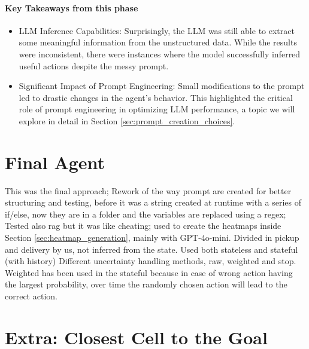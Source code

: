 \paragraph{Key Takeaways from this phase}
\begin{itemize}
  \item LLM Inference Capabilities: Surprisingly, the LLM was still able to extract
    some meaningful information from the unstructured data. While the results
    were inconsistent, there were instances where the model successfully inferred
    useful actions despite the messy prompt.

  \item Significant Impact of Prompt Engineering: Small modifications to the
    prompt led to drastic changes in the agent's behavior. This highlighted the critical
    role of prompt engineering in optimizing LLM performance, a topic we will
    explore in detail in Section \ref{sec:prompt_creation_choices}.
\end{itemize}

\section{Final Agent}
\label{sec:final_agent}

This was the final approach; Rework of the way prompt are created for better structuring
and testing, before it was a string created at runtime with a series of if/else,
now they are in a folder and the variables are replaced using a regex; Tested
also rag but it was like cheating; used to create the heatmaps inside Section \ref{sec:heatmap_generation},
mainly with GPT-4o-mini. Divided in pickup and delivery by us, not inferred from
the state. Used both stateless and stateful (with history) Different uncertainty
handling methods, raw, weighted and stop. Weighted has been used in the stateful
because in case of wrong action having the largest probability, over time the randomly
chosen action will lead to the correct action.

\section{Extra: Closest Cell to the Goal}
\label{sec:closest_cell_to_the_goal}